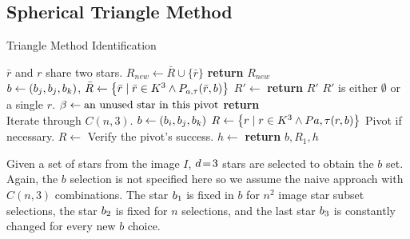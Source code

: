 \subsection{Spherical Triangle Method}\label{subsec:sphericalTriangleMethod}
\begin{algorithm}
    \caption{Triangle Method Identification} \label{algorithm:triangleIdentification}
    \begin{algorithmic}[1]
        \LineComment $\bar{r}$ and $r$ share two stars.
        \State $R_{new} \gets \bar{R} \cup \{\bar{r}\}$
        \EndIf
        \EndFor
        \State \textbf{return} $R_{new}$
        \EndFunction
        \\
        \State $b \gets (b_j, b_j, b_k)$, $\bar{R} \gets \left\{  \bar{r} \mid \bar{r} \in K^3
        \land P_{a, \tau}(\bar{r}, b)  \right\}$
        \State $R' \gets $ 
        \State \textbf{return} $R'$ \Comment $R'$ is either $\emptyset$ or a single $r$.
        \Else
        \State $\beta \gets \text{an unused star in this pivot}$
        \State \textbf{return} 
        \EndIf
        \EndFunction
        \\
          \Comment Iterate through $C(n, 3)$.
        \State $b \gets \left(b_i, b_j, b_k\right)$
        \State $R \gets \left\{  r \mid r \in K^3
        \land P{a, \tau}(r, b)  \right\}$
         \Comment Pivot if necessary.
        \State $R \gets $ 
        \EndIf
         \Comment Verify the pivot's success.
        \State $h \gets $ 
        \invalidBijection
        \State \textbf{return} $b, R_1, h$
        \EndIf
        \EndIf
        \EndFor
        \EndFor
        \EndFor
        \EndFunction
    \end{algorithmic}
\end{algorithm}

Given a set of stars from the image $I$, $d \!=\! 3$ stars are selected to obtain the $b$ set.
Again, the $b$ selection is not specified here so we assume the naive approach with $C(n, 3)$ combinations.
The star $b_1$ is fixed in $b$ for $n^2$ image star subset selections, the star $b_2$ is fixed for
$n$ selections, and the last star $b_3$ is constantly changed for every new $b$ choice.

